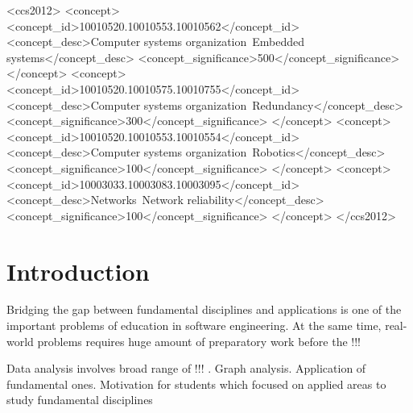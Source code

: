 \documentclass[sigconf]{acmart}
\begin{document}
\begin{CCSXML}
<ccs2012>
 <concept>
  <concept_id>10010520.10010553.10010562</concept_id>
  <concept_desc>Computer systems organization~Embedded systems</concept_desc>
  <concept_significance>500</concept_significance>
 </concept>
 <concept>
  <concept_id>10010520.10010575.10010755</concept_id>
  <concept_desc>Computer systems organization~Redundancy</concept_desc>
  <concept_significance>300</concept_significance>
 </concept>
 <concept>
  <concept_id>10010520.10010553.10010554</concept_id>
  <concept_desc>Computer systems organization~Robotics</concept_desc>
  <concept_significance>100</concept_significance>
 </concept>
 <concept>
  <concept_id>10003033.10003083.10003095</concept_id>
  <concept_desc>Networks~Network reliability</concept_desc>
  <concept_significance>100</concept_significance>
 </concept>
</ccs2012>
\end{CCSXML}




\maketitle

\section{Introduction}

Bridging the gap between fundamental disciplines and applications is one of the important problems of education in software engineering.
At the same time, real-world problems requires huge amount of preparatory work before the !!!

Data analysis involves broad range of !!! .
Graph analysis.
Application of fundamental ones.
Motivation for students which focused on applied areas to study fundamental disciplines 
\end{document}

